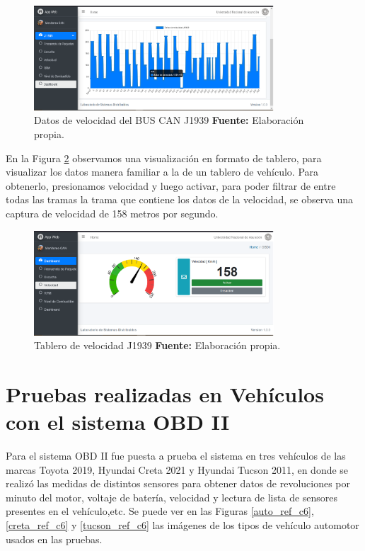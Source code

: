 \begin{figure}[H]
	\centering
	\includegraphics[width=0.8\textwidth]{./Cap6imagen/real_fig_c6.png}
	\caption [Datos de Velocidad del BUS CAN J1939.]{Datos de velocidad del BUS CAN J1939 \textbf{ Fuente:} %
		Elaboración propia.}
	\label{real_ref_c6} %
\end{figure}


En la Figura \ref{gauge_ref_c6} observamos una visualización en formato de tablero, para visualizar los datos manera familiar a la de un tablero de vehículo. 
Para obtenerlo, presionamos velocidad y luego activar, para poder filtrar de entre todas las tramas la trama que contiene los datos de la velocidad, se observa una captura de velocidad de 158 metros por segundo. 


\begin{figure}[H]
	\centering
	\includegraphics[width=0.8\textwidth]{./Cap6imagen/gauge_fig_c6.png}
	\caption [Tablero de Velocidad J1939.]{Tablero de velocidad J1939 \textbf{ Fuente:} %
		Elaboración propia.}
	\label{gauge_ref_c6} %
\end{figure}

\section{Pruebas realizadas en Vehículos con el sistema OBD II}

Para el sistema OBD II fue puesta a prueba el sistema en tres vehículos de las marcas Toyota 2019, Hyundai Creta 2021 y Hyundai Tucson 2011, en donde se realizó las medidas de distintos sensores para obtener datos de revoluciones por minuto del motor, voltaje de batería, velocidad y lectura de lista de sensores presentes en el vehículo,etc. 
Se puede ver en las Figuras \ref{auto_ref_c6}, \ref{creta_ref_c6} y \ref{tucson_ref_c6}  las imágenes de los tipos de vehículo automotor usados en las pruebas. 

